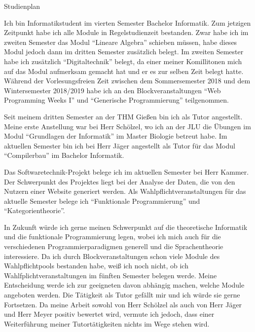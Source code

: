 \documentclass[11pt, parskip=half]{scrartcl}
\begin{document}
\begin{center}
  \begin{LARGE}
    Studienplan
  \end{LARGE}
\end{center}

Ich bin Informatikstudent im vierten Semester Bachelor Informatik.
Zum jetzigen Zeitpunkt habe ich alle Module in Regelstudienzeit bestanden.
Zwar habe ich im zweiten Semester das Modul ``Lineare Algebra'' schieben müssen, habe dieses Modul jedoch dann im dritten Semester zusätzlich belegt.
Im zweiten Semester habe ich zusätzlich ``Digitaltechnik'' belegt, da einer meiner Komillitonen mich auf das Modul aufmerksam gemacht hat und er es zur selben Zeit belegt hatte.
Während der Vorlesungsfreien Zeit zwischen dem Sommersemester 2018 und dem Wintersemester 2018/2019 habe ich an den Blockveranstaltungen ``Web Programming Weeks I'' und ``Generische Programmierung'' teilgenommen.

Seit meinem dritten Semester an der THM Gießen bin ich als Tutor angestellt.
Meine erste Anstellung war bei Herr Schölzel, wo ich an der JLU die Übungen im Modul ``Grundlagen der Informatik'' im Master Biologie betreut habe.
Im aktuellen Semester bin ich bei Herr Jäger angestellt als Tutor für das Modul ``Compilerbau'' im Bachelor Informatik.

Das Softwaretechnik-Projekt belege ich im aktuellen Semester bei Herr Kammer.
Der Schwerpunkt des Projektes liegt bei der Analyse der Daten, die von den Nutzern einer Website generiert werden.
Als Wahlpflichtveranstaltungen für das aktuelle Semester belege ich ``Funktionale Programmierung'' und ``Kategorientheorie''.

In Zukunft würde ich gerne meinen Schwerpunkt auf die theoretische Informatik und die funktionale Programmierung legen, wobei ich mich auch für die verschiedenen Programmierparadigmen generell und die Sprachentheorie interessiere.
Da ich durch Blockveranstaltungen schon viele Module des Wahlpflichtpools bestanden habe, weiß ich noch nicht, ob ich Wahlfplichtveranstaltungen im fünften Semester belegen werde.
Meine Entscheidung werde ich zur geeigneten davon abhängig machen, welche Module angeboten werden.
Die Tätigkeit als Tutor gefällt mir und ich würde sie gerne Fortsetzen.
Da meine Arbeit sowohl von Herr Schölzel als auch von Herr Jäger und Herr Meyer positiv bewertet wird, vermute ich jedoch, dass einer Weiterführung meiner Tutortätigkeiten nichts im Wege stehen wird.


 
\end{document}
